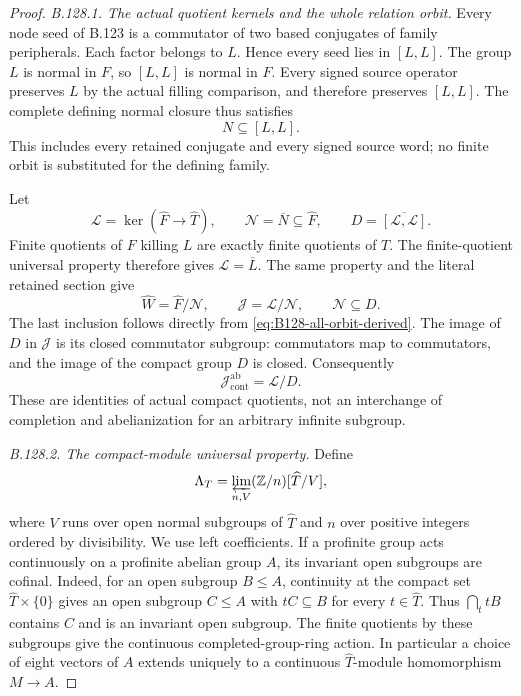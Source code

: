 \begin{proof}
\emph{B.128.1. The actual quotient kernels and the whole relation orbit.}
Every node seed of B.123 is a commutator of two based conjugates
of family peripherals. Each factor belongs to $L$. Hence every
seed lies in $[L,L]$. The group $L$ is normal in $F$, so $[L,L]$
is normal in $F$. Every signed source operator preserves $L$
by the actual filling comparison, and therefore preserves $[L,L]$.
The complete defining normal closure thus satisfies
\begin{equation}\label{eq:B128-all-orbit-derived}
 N\subseteq[L,L].
\end{equation}
This includes every retained conjugate and every signed source
word; no finite orbit is substituted for the defining family.

Let
\[
 \mathcal L=\ker(\widehat F\to\widehat T),\qquad
 \mathcal N=\overline N\subseteq\widehat F,
 \qquad D=\overline{[\mathcal L,\mathcal L]}.
\]
Finite quotients of $F$ killing $L$ are exactly finite quotients
of $T$. The finite-quotient universal property therefore gives
$\mathcal L=\overline L$. The same property and the literal
retained section give
\begin{equation}\label{eq:B128-actual-closed-kernels}
 \widehat W=\widehat F/\mathcal N,
 \qquad \mathcal J=\mathcal L/\mathcal N,
 \qquad \mathcal N\subseteq D.
\end{equation}
The last inclusion follows directly from
\eqref{eq:B128-all-orbit-derived}. The image of $D$ in
$\mathcal J$ is its closed commutator subgroup: commutators map
to commutators, and the image of the compact group $D$ is closed.
Consequently
\begin{equation}\label{eq:B128-abelian-closed-quotient}
 \mathcal J^{\mathrm{ab}}_{\mathrm{cont}}=\mathcal L/D.
\end{equation}
These are identities of actual compact quotients, not an interchange
of completion and abelianization for an arbitrary infinite subgroup.

\emph{B.128.2. The compact-module universal property.}
Define
\[
 \Lambda_T=
 \varprojlim_{n,V}(\mathbb Z/n)[\widehat T/V],
\]
where $V$ runs over open normal subgroups of $\widehat T$ and
$n$ over positive integers ordered by divisibility. We use left
coefficients. If a profinite group acts continuously on a profinite
abelian group $A$, its invariant open subgroups are cofinal.
Indeed, for an open subgroup $B\leq A$, continuity at the compact
set $\widehat T\times\{0\}$ gives an open subgroup $C\leq A$
with $tC\subseteq B$ for every $t\in\widehat T$. Thus
$\bigcap_t tB$ contains $C$ and is an invariant open subgroup.
The finite quotients by these subgroups give the continuous
completed-group-ring action. In particular a choice of eight
vectors of $A$ extends uniquely to a continuous
$\widehat T$-module homomorphism $M\to A$.


\end{proof}
